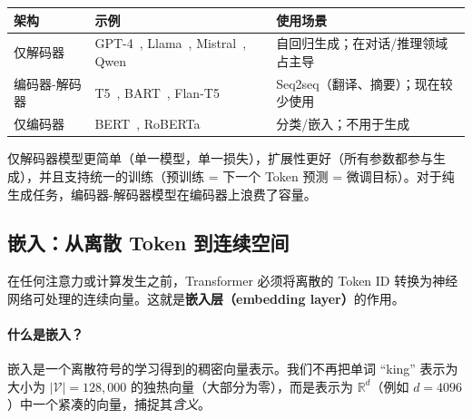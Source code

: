 \noindent\begin{tabularx}{\linewidth}{@{}l Z{1.42} Z{0.58}@{}}
\toprule
\textbf{架构} & \textbf{示例} & \textbf{使用场景} \\
\midrule
仅解码器 & GPT-4~\cite{openai2023gpt4}, Llama~\cite{grattafiori2024llama3}, Mistral~\cite{jiang2023mistral}, Qwen~\cite{qwen2024qwen25} & 自回归生成；在对话/推理领域占主导 \\
编码器-解码器 & T5~\cite{raffel2020t5}, BART~\cite{lewis2020bart}, Flan-T5~\cite{chung2022flan} & Seq2seq（翻译、摘要）；现在较少使用 \\
仅编码器 & BERT~\cite{devlin2019bert}, RoBERTa~\cite{liu2019roberta} & 分类/嵌入；不用于生成 \\
\bottomrule
\end{tabularx}

\begin{warningbox}[为什么仅解码器胜出]
仅解码器模型更简单（单一模型，单一损失），扩展性更好（所有参数都参与生成），并且支持统一的训练（预训练 = 下一个 Token 预测 = 微调目标）。对于纯生成任务，编码器-解码器模型在编码器上浪费了容量。
\end{warningbox}

\subsection{嵌入：从离散 Token 到连续空间}
\label{embeddings-from-discrete-tokens-to-continuous-space}

在任何注意力或计算发生之前，Transformer 必须将离散的 Token ID 转换为神经网络可处理的连续向量。这就是\textbf{嵌入层（embedding layer）}的作用。

\paragraph{什么是嵌入？}
\label{what-is-an-embedding}

嵌入是一个离散符号的学习得到的稠密向量表示。我们不再把单词 ``king'' 表示为大小为 $|\mathcal{V}| = 128{,}000$ 的独热向量（大部分为零），而是表示为 $\mathbb{R}^d$（例如 $d = 4096$）中一个紧凑的向量，捕捉其\emph{含义}。

